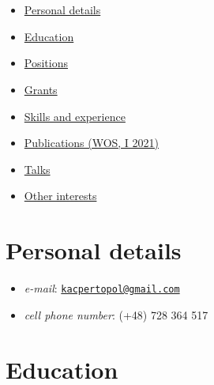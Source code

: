 \hypertarget{section}{%
\section{}\label{section}}

\begin{itemize}
\tightlist
\item
  \protect\hyperlink{personal-details}{Personal details}
\item
  \protect\hyperlink{education}{Education}
\item
  \protect\hyperlink{positions}{Positions}
\item
  \protect\hyperlink{grants}{Grants}
\item
  \protect\hyperlink{skills-and-experience}{Skills and experience}
\item
  \href{./0pl.html}{Publications (WOS, I 2021)}
\item
  \href{./00pl.html}{Talks}
\item
  \protect\hyperlink{other-interests}{Other interests}
\end{itemize}

\hypertarget{personal-details}{%
\section{Personal details}\label{personal-details}}

\begin{itemize}
\tightlist
\item
  \emph{e-mail}:
  \href{mailto:kacpertopol@gmail.com}{\nolinkurl{kacpertopol@gmail.com}}
\item
  \emph{cell phone number}: (+48) 728 364 517
\end{itemize}

\hypertarget{education}{%
\section{Education}\label{education}}

